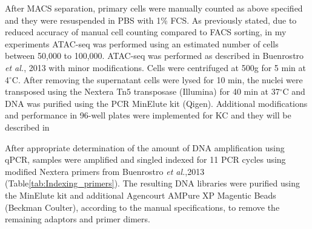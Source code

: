 After MACS separation, primary cells were manually counted as above specified and they were resuspended in PBS with 1\% FCS. As previously stated, due to reduced accuracy of manual cell counting compared to FACS sorting, in my experiments ATAC-seq was performed using an estimated number of cells between 50,000 to 100,000. ATAC-seq was performed as described in Buenrostro \textit{et al.}, 2013 with minor modifications. Cells were centrifuged at 500g for 5 min at 4{$^\circ$}C. After removing the supernatant cells were lysed for 10 min, the nuclei were transposed using the Nextera Tn5 transposase (Illumina) for 40 min at 37{$^\circ$}C and DNA was purified using the PCR MinElute kit (Qigen). Additional modifications and performance in 96-well plates were implemented for KC and they will be described in %

After appropriate determination of the amount of DNA amplification using qPCR, samples were amplified and singled indexed for 11 PCR cycles using modified Nextera primers from Buenrostro \textit{et al.},2013 (Table\ref{tab:Indexing_primers}). The resulting DNA libraries were purified using the MinElute kit and additional Agencourt AMPure XP Magentic Beads (Beckman Coulter), according to the manual specifications, to remove the remaining adaptors and primer dimers.

